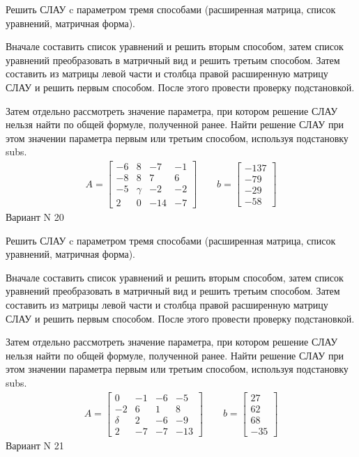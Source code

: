 \documentclass[11pt]{report}
\begin{document}
Решить СЛАУ c параметром тремя способами (расширенная матрица, список уравнений, матричная форма).

Вначале составить список уравнений и решить вторым способом,
затем список уравнений преобразовать в матричный вид и решить третьим способом.
Затем составить из матрицы левой части и столбца правой расширенную матрицу СЛАУ и решить первым способом.
После этого провести проверку подстановкой.

Затем отдельно рассмотреть значение параметра, при котором решение СЛАУ нельзя найти по общей формуле,
полученной ранее.
Найти решение СЛАУ при этом значении параметра первым или третьим способом, используя подстановку subs.
\begin{align*}
    A = \left[\begin{matrix}-6 & 8 & -7 & -1\\-8 & 8 & 7 & 6\\-5 & \gamma & -2 & -2\\2 & 0 & -14 & -7\end{matrix}\right]
\qquad b = \left[\begin{matrix}-137\\-79\\-29\\-58\end{matrix}\right]
\end{align*}
\newpage
Вариант N 20


Решить СЛАУ c параметром тремя способами (расширенная матрица, список уравнений, матричная форма).

Вначале составить список уравнений и решить вторым способом,
затем список уравнений преобразовать в матричный вид и решить третьим способом.
Затем составить из матрицы левой части и столбца правой расширенную матрицу СЛАУ и решить первым способом.
После этого провести проверку подстановкой.

Затем отдельно рассмотреть значение параметра, при котором решение СЛАУ нельзя найти по общей формуле,
полученной ранее.
Найти решение СЛАУ при этом значении параметра первым или третьим способом, используя подстановку subs.
\begin{align*}
    A = \left[\begin{matrix}0 & -1 & -6 & -5\\-2 & 6 & 1 & 8\\\delta & 2 & -6 & -9\\2 & -7 & -7 & -13\end{matrix}\right]
\qquad b = \left[\begin{matrix}27\\62\\68\\-35\end{matrix}\right]
\end{align*}
\newpage
Вариант N 21
\end{document}
